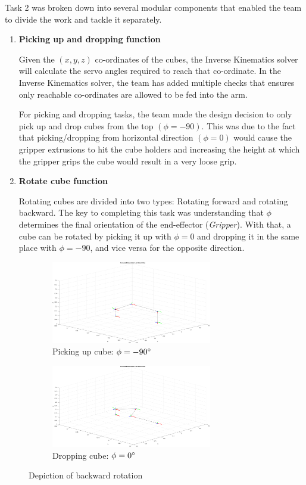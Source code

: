 \documentclass[9pt, a4paper]{article}
\begin{document}
Task 2 was broken down into several modular components that enabled the team to
divide the work and tackle it separately. 
\begin{enumerate}
  \item \textbf{Picking up and dropping function}
  
  Given the $(x,y,z)$ co-ordinates of the cubes, the Inverse Kinematics solver
  will calculate the servo angles required to reach that co-ordinate. In the
  Inverse Kinematics solver, the team has added multiple checks that ensures
  only reachable co-ordinates are allowed to be fed into the arm. 
  
  For picking and dropping tasks, the team made the design decision to only pick
  up and drop cubes from the top $(\phi = -90)$. This was due to the fact that
  picking/dropping from horizontal direction $(\phi=0)$ would cause the gripper
  extrusions to hit the cube holders and increasing the height at which the
  gripper grips the cube would result in a very loose grip. 
  
  \item \textbf{Rotate cube function}
  
  Rotating cubes are divided into two types: Rotating forward and rotating
  backward. The key to completing this task was understanding that $\phi$
  determines the final orientation of the end-effector (\textit{Gripper}). With
  that, a cube can be rotated by picking it up with $\phi = 0$ and dropping it in
  the same place with $\phi = -90$, and vice versa for the opposite direction. 
\end{enumerate}
\begin{figure}[h]
  \centering
  \begin{subfigure}{.5\textwidth}
    \centering
    \includegraphics[width=7cm]{1}
    \caption{Picking up cube: $\phi = -90\degree$}
  \end{subfigure}%
  \begin{subfigure}{.5\textwidth}
    \centering
    \includegraphics[width=7cm]{2}
    \caption{Dropping cube: $\phi = 0\degree$}
  \end{subfigure}
  \caption{Depiction of backward rotation}
\end{figure}
\end{document}
